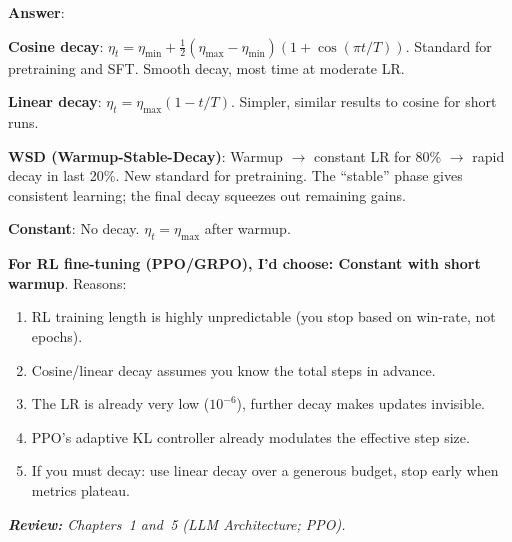 \begin{questionbox}
\textbf{Answer}:

\textbf{Cosine decay}: $\eta_t = \eta_\text{min} + \frac{1}{2}(\eta_\text{max} - \eta_\text{min})(1 + \cos(\pi t/T))$. Standard for pretraining and SFT. Smooth decay, most time at moderate LR.

\textbf{Linear decay}: $\eta_t = \eta_\text{max}(1 - t/T)$. Simpler, similar results to cosine for short runs.

\textbf{WSD (Warmup-Stable-Decay)}: Warmup $\rightarrow$ constant LR for 80\% $\rightarrow$ rapid decay in last 20\%. New standard for pretraining. The ``stable'' phase gives consistent learning; the final decay squeezes out remaining gains.

\textbf{Constant}: No decay. $\eta_t = \eta_\text{max}$ after warmup.

\textbf{For RL fine-tuning (PPO/GRPO), I’d choose: Constant with short warmup}. Reasons:

\begin{enumerate}
  \item RL training length is highly unpredictable (you stop based on win-rate, not epochs).
  \item Cosine/linear decay assumes you know the total steps in advance.
  \item The LR is already very low ($10^{-6}$), further decay makes updates invisible.
  \item PPO’s adaptive KL controller already modulates the effective step size.
  \item If you must decay: use linear decay over a generous budget, stop early when metrics plateau.
\end{enumerate}

\emph{\textbf{Review:} Chapters~1 and~5 (LLM Architecture; PPO).}
\end{questionbox}

